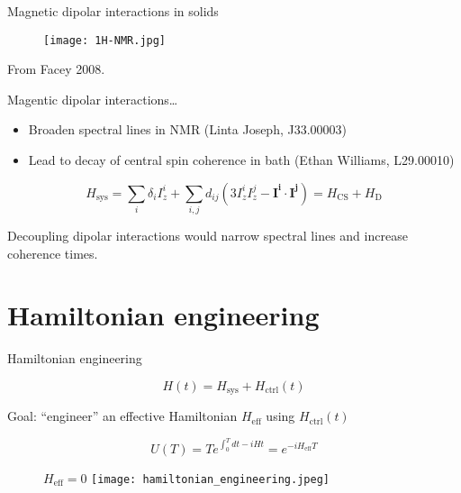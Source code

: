 \documentclass{beamer}
\begin{document}
\begin{frame}{Magnetic dipolar interactions in solids}

\begin{figure}
\centering
\texttt{[image: 1H-NMR.jpg]}
\hfill
\scalebox{.6}{

}
\end{figure}
\vspace{-1em}
\hspace{3em}
{\scriptsize%
\nocite{Ottowa-NMR}
From Facey 2008.%
}

Magentic dipolar interactions\dots
\begin{itemize}
    \item Broaden spectral lines in NMR (Linta Joseph, J33.00003)
    \item Lead to decay of central spin coherence in bath (Ethan Williams, L29.00010)
\end{itemize}

{\footnotesize
\[
    H_{\text{sys}} = \sum_i \delta_i I_z^i + \sum_{i,j} d_{ij} \left( 3I_z^iI_z^j - \mathbf{I^i} \cdot \mathbf{I^j} \right)
    = H_\text{CS} + H_\text{D}
\]
}

Decoupling dipolar interactions would narrow spectral lines and increase coherence times.


\end{frame}

\section{Hamiltonian engineering}


\begin{frame}{Hamiltonian engineering}


\[
H(t) = H_{\text{sys}} + H_{\text{ctrl}}(t)
\]

Goal: ``engineer'' an effective Hamiltonian $H_{\text{eff}}$ using $H_{\text{ctrl}}(t)$

\[
U(T) = Te^{\int_0^T dt -i H t } = e^{-i H_{\text{eff}} T}
\]

\begin{figure}
$H_{\text{eff}} = 0$
\texttt{[image: hamiltonian\_engineering.jpeg]}
\end{figure}



\end{frame}
\end{document}
